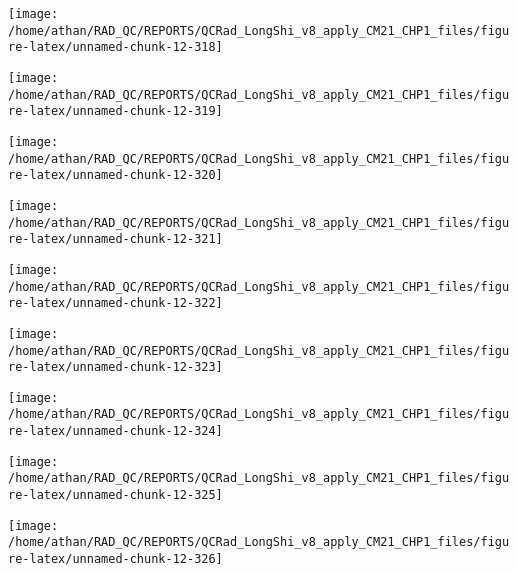 \documentclass[
  10pt,
  a4paper,oneside]{article}
\begin{document}
\begin{center}\texttt{[image: /home/athan/RAD\_QC/REPORTS/QCRad\_LongShi\_v8\_apply\_CM21\_CHP1\_files/figure-latex/unnamed-chunk-12-318]} \end{center}

\begin{center}\texttt{[image: /home/athan/RAD\_QC/REPORTS/QCRad\_LongShi\_v8\_apply\_CM21\_CHP1\_files/figure-latex/unnamed-chunk-12-319]} \end{center}

\begin{center}\texttt{[image: /home/athan/RAD\_QC/REPORTS/QCRad\_LongShi\_v8\_apply\_CM21\_CHP1\_files/figure-latex/unnamed-chunk-12-320]} \end{center}

\begin{center}\texttt{[image: /home/athan/RAD\_QC/REPORTS/QCRad\_LongShi\_v8\_apply\_CM21\_CHP1\_files/figure-latex/unnamed-chunk-12-321]} \end{center}

\begin{center}\texttt{[image: /home/athan/RAD\_QC/REPORTS/QCRad\_LongShi\_v8\_apply\_CM21\_CHP1\_files/figure-latex/unnamed-chunk-12-322]} \end{center}

\begin{center}\texttt{[image: /home/athan/RAD\_QC/REPORTS/QCRad\_LongShi\_v8\_apply\_CM21\_CHP1\_files/figure-latex/unnamed-chunk-12-323]} \end{center}

\begin{center}\texttt{[image: /home/athan/RAD\_QC/REPORTS/QCRad\_LongShi\_v8\_apply\_CM21\_CHP1\_files/figure-latex/unnamed-chunk-12-324]} \end{center}

\begin{center}\texttt{[image: /home/athan/RAD\_QC/REPORTS/QCRad\_LongShi\_v8\_apply\_CM21\_CHP1\_files/figure-latex/unnamed-chunk-12-325]} \end{center}

\begin{center}\texttt{[image: /home/athan/RAD\_QC/REPORTS/QCRad\_LongShi\_v8\_apply\_CM21\_CHP1\_files/figure-latex/unnamed-chunk-12-326]} \end{center}
\end{document}
